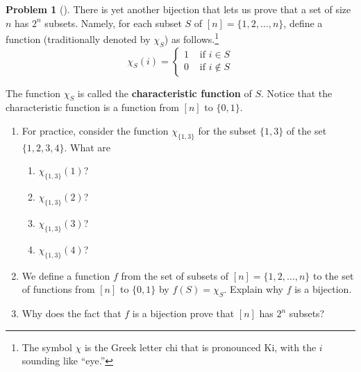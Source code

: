 \documentclass[10pt,]{book}
\newcommand{\terminology}[1]{\textbf{#1}}
\theoremstyle{plain}
\theoremstyle{definition}
\newtheorem{activity}[project]{Problem}
\theoremstyle{definition}
\numberwithin{equation}{chapter}
\newcommand{\amp}{&}
\begin{document}
\begin{activity}[]\marginsymbol[-1em]{} \label{charfunction}
\hypertarget{p-183}{}%
There is yet another bijection that lets us prove that a set of size \(n\) has \(2^n\) subsets. Namely, for each subset \(S\) of \([n]=\{1,2,\ldots, n\}\), define a function (traditionally denoted by \(\chi_S\)) as follows.\footnote{The symbol \(\chi\) is the Greek letter chi that is pronounced Ki, with the \(i\) sounding like ``eye.''\label{fn-1}}%
\begin{equation*}
\chi_S(i) = \begin{cases}1 \amp \text{ if }  i\in S \\ 0 \amp \text{ if }  i\not\in
S
\end{cases}
\end{equation*}
%
\par
\hypertarget{p-184}{}%
The function \(\chi_S\) is called the \terminology{characteristic function} of \(S\). Notice that the characteristic function is a function from \([n]\) to \(\{0,1\}\).%
\begin{enumerate}[font=\bfseries,label=(\alph*),ref=\alph*]
\item\label{task-28} \marginsymbol[-2.5em]{} \hypertarget{p-185}{}%
For practice, consider the function \(\chi_{\{1,3\}}\) for the subset \(\{1,3\}\) of the set \(\{1,2,3,4\}\).  What are%
\begin{enumerate}[font=\bfseries,label=(\roman*),ref=\theenumi.\roman*]
\item\label{task-29} \marginsymbol[-2.5em]{} \hypertarget{p-186}{}%
\(\chi_{\{1,3\}}(1)\)?%
\item\label{task-30} \marginsymbol[-2.5em]{} \hypertarget{p-188}{}%
\(\chi_{\{1,3\}}(2)\)?%
\item\label{task-31} \marginsymbol[-2.5em]{} \hypertarget{p-190}{}%
\(\chi_{\{1,3\}}(3)\)?%
\item\label{task-32} \marginsymbol[-2.5em]{} \hypertarget{p-192}{}%
\(\chi_{\{1,3\}}(4)\)?%
\end{enumerate}
\item\label{task-33} \marginsymbol[-2.5em]{} \hypertarget{p-194}{}%
We define a function \(f\) from the set of subsets of \([n]=\{1,2,\ldots, n\}\) to the set of functions from \([n]\) to \(\{0,1\}\) by \(f(S)=\chi_S\).  Explain why \(f\) is a bijection.%
\item\label{task-34} \marginsymbol[-2.5em]{} \hypertarget{p-196}{}%
Why does the fact that \(f\) is a bijection prove that \([n]\) has \(2^n\) subsets?%
\end{enumerate}
\end{activity}
\end{document}
